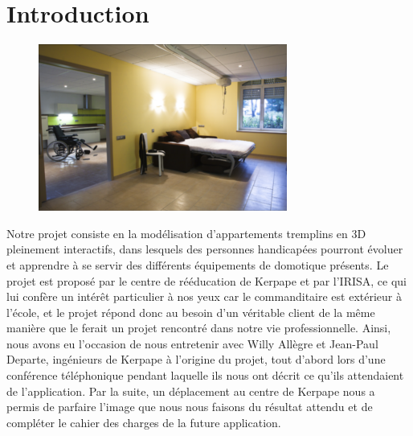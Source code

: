 \section{Introduction}

\begin{figure}
	\centering
	\includegraphics[scale=1]{1-PreEtude/img/appt_tremplin_intro.png}
\end{figure}
Notre projet consiste en la modélisation d'appartements tremplins en 3D pleinement interactifs, dans lesquels des personnes handicapées pourront évoluer et apprendre à se servir des différents équipements de domotique présents. 
Le projet est proposé par le centre de rééducation de Kerpape et par l'IRISA, ce qui lui confère un intérêt particulier à nos yeux car le commanditaire est extérieur à l'école, et le projet répond donc au besoin d'un véritable client de la même manière que le ferait un projet rencontré dans notre vie professionnelle. 
Ainsi, nous avons eu l'occasion de nous entretenir avec Willy Allègre et Jean-Paul Departe, ingénieurs de Kerpape à l'origine du projet, tout d'abord lors d'une conférence téléphonique pendant laquelle ils nous ont décrit ce qu'ils attendaient de l'application. Par la suite, un déplacement au centre de Kerpape nous a permis de parfaire l'image que nous nous faisons du résultat attendu et de compléter le cahier des charges de la future application. \newline

